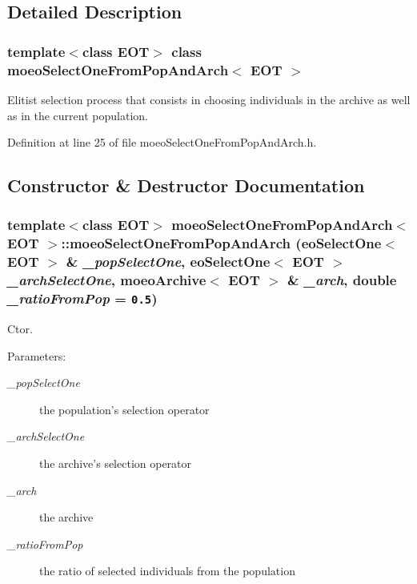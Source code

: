 \subsection{Detailed Description}
\subsubsection*{template$<$class EOT$>$ class moeo\-Select\-One\-From\-Pop\-And\-Arch$<$ EOT $>$}

Elitist selection process that consists in choosing individuals in the archive as well as in the current population. 



Definition at line 25 of file moeo\-Select\-One\-From\-Pop\-And\-Arch.h.

\subsection{Constructor \& Destructor Documentation}
\subsubsection{\setlength{\rightskip}{0pt plus 5cm}template$<$class EOT$>$ {\bf moeo\-Select\-One\-From\-Pop\-And\-Arch}$<$ EOT $>$::{\bf moeo\-Select\-One\-From\-Pop\-And\-Arch} ({\bf eo\-Select\-One}$<$ EOT $>$ \& {\em \_\-pop\-Select\-One}, {\bf eo\-Select\-One}$<$ EOT $>$ {\em \_\-arch\-Select\-One}, {\bf moeo\-Archive}$<$ EOT $>$ \& {\em \_\-arch}, double {\em \_\-ratio\-From\-Pop} = {\tt 0.5})\hspace{0.3cm}{\tt  [inline]}}\label{classmoeoSelectOneFromPopAndArch_8d75155e2bb6994b080c696d6382c6c9}


Ctor. 

\begin{Desc}
\item[Parameters:]
\begin{description}
\item[{\em \_\-pop\-Select\-One}]the population's selection operator \item[{\em \_\-arch\-Select\-One}]the archive's selection operator \item[{\em \_\-arch}]the archive \item[{\em \_\-ratio\-From\-Pop}]the ratio of selected individuals from the population \end{description}
\end{Desc}


